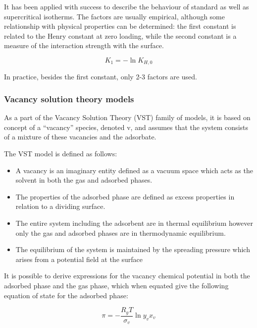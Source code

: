 It has been applied with success to describe the behaviour of standard as
well as supercritical isotherms. The factors are usually empirical,
although some relationship with physical properties can be determined:
the first constant is related to the Henry constant at zero loading, while
the second constant is a measure of the interaction strength with the surface.

\begin{equation}
    K_1 = -\ln{K_{H,0}}
\end{equation}

In practice, besides the first constant, only 2-3 factors are used.


\subsubsection{Vacancy solution theory models}


As a part of the Vacancy Solution Theory (VST) family of models, it is based on concept
of a “vacancy” species, denoted v, and assumes that the system consists of a
mixture of these vacancies and the adsorbate.

The VST model is defined as follows:

\begin{itemize}
    
    \item A vacancy is an imaginary entity defined as a vacuum space
    which acts as the solvent in both the gas and adsorbed phases.
    \item The properties of the adsorbed phase are defined as excess properties
    in relation to a dividing surface.
    \item The entire system including the adsorbent are in thermal equilibrium
    however only the gas and adsorbed phases are in thermodynamic equilibrium.
    \item The equilibrium of the system is maintained by the spreading pressure
    which arises from a potential field at the surface

\end{itemize}
    
It is possible to derive expressions for the vacancy chemical potential in both
the adsorbed phase and the gas phase, which when equated give the following equation
of state for the adsorbed phase:

\begin{equation}
    \pi = - \frac{R_g T}{\sigma_v} \ln{y_v x_v}
\end{equation}

